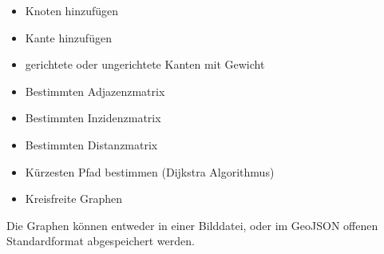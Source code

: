 {\begin{itemize}
\item Knoten hinzuf\"ugen
\item Kante hinzuf\"ugen
\item gerichtete oder ungerichtete Kanten mit Gewicht
\item Bestimmten Adjazenzmatrix
\item Bestimmten Inzidenzmatrix
\item Bestimmten Distanzmatrix 
\item K\"urzesten Pfad bestimmen (Dijkstra Algorithmus)
\item Kreisfreite Graphen
\end{itemize}
Die Graphen k\"onnen entweder in einer Bilddatei, oder im GeoJSON\cite{rfc7946} offenen Standardformat abgespeichert werden.
	\ifeng
	\else
	\fi
}

